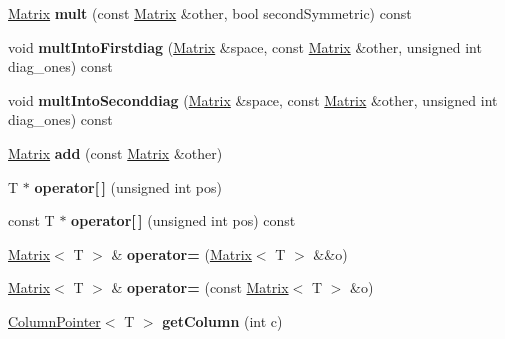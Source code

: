 \begin{DoxyCompactItemize}
\item 
\mbox{\label{class_matrix_a25f80fd0cbbaf757774b82330c25498b}} 
\mbox{\hyperlink{class_matrix}{Matrix}} {\bfseries mult} (const \mbox{\hyperlink{class_matrix}{Matrix}} \&other, bool second\+Symmetric) const
\item 
\mbox{\label{class_matrix_a9616e1c8e2fc6d0f23f68e24a360bb74}} 
void {\bfseries mult\+Into\+Firstdiag} (\mbox{\hyperlink{class_matrix}{Matrix}} \&space, const \mbox{\hyperlink{class_matrix}{Matrix}} \&other, unsigned int diag\+\_\+ones) const
\item 
\mbox{\label{class_matrix_ae79ba08289fa4a5cce500600bceecf09}} 
void {\bfseries mult\+Into\+Seconddiag} (\mbox{\hyperlink{class_matrix}{Matrix}} \&space, const \mbox{\hyperlink{class_matrix}{Matrix}} \&other, unsigned int diag\+\_\+ones) const
\item 
\mbox{\label{class_matrix_ad87e947c927874f9beda7d16fff5afc7}} 
\mbox{\hyperlink{class_matrix}{Matrix}} {\bfseries add} (const \mbox{\hyperlink{class_matrix}{Matrix}} \&other)
\item 
\mbox{\label{class_matrix_af617041ed6031b8ba6957019b603a7b8}} 
T $\ast$ {\bfseries operator\mbox{[}$\,$\mbox{]}} (unsigned int pos)
\item 
\mbox{\label{class_matrix_a04e43936605f47cfdca18ae5a2be6408}} 
const T $\ast$ {\bfseries operator\mbox{[}$\,$\mbox{]}} (unsigned int pos) const
\item 
\mbox{\label{class_matrix_ad91f6e9d9e202f2659f82a8a5f66f1a2}} 
\mbox{\hyperlink{class_matrix}{Matrix}}$<$ T $>$ \& {\bfseries operator=} (\mbox{\hyperlink{class_matrix}{Matrix}}$<$ T $>$ \&\&o)
\item 
\mbox{\label{class_matrix_a8928d5b346233d7e5202d6a38ee517e9}} 
\mbox{\hyperlink{class_matrix}{Matrix}}$<$ T $>$ \& {\bfseries operator=} (const \mbox{\hyperlink{class_matrix}{Matrix}}$<$ T $>$ \&o)
\item 
\mbox{\label{class_matrix_a307da11b5adcd2d12ce2494000469516}} 
\mbox{\hyperlink{class_column_pointer}{Column\+Pointer}}$<$ T $>$ {\bfseries get\+Column} (int c)

\end{DoxyCompactItemize}
